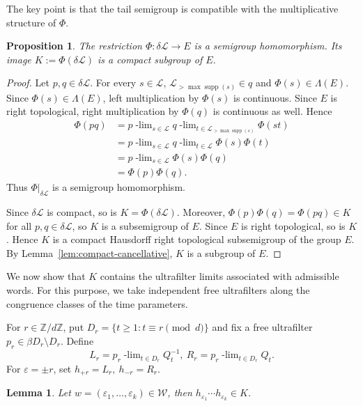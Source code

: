 \documentclass[11pt]{amsart}
\newtheorem{proposition}[theorem]{Proposition}
\newtheorem{lemma}[theorem]{Lemma}
\theoremstyle{definition}
\theoremstyle{remark}
\newcommand{\Z}{\mathbb Z}
\newcommand{\cL}{\mathcal L}
\newcommand{\cW}{\mathcal W}
\newcommand{\supp}{\operatorname{supp}}
\newcommand{\ulim}[2]{#1\!\operatorname{-lim}_{#2}}
\begin{document}
The key point is that the tail semigroup is compatible with the
multiplicative structure of $\Phi$.
\begin{proposition}\label{prop:Phi-delta}
The restriction $\Phi:\delta\cL\longrightarrow E$
is a semigroup homomorphism.  Its image $K:=\Phi(\delta\cL) $
is a compact subgroup of $E$.
\end{proposition}

\begin{proof}
Let $p,q\in\delta\cL$.  For every $s\in\cL$, $\cL_{>\max\supp(s)}\in q$ and $\Phi(s)\in\Lambda(E)$.
Since $\Phi(s)\in\Lambda(E)$, left multiplication by $\Phi(s)$ is
continuous.  Since $E$ is right topological, right multiplication by $\Phi(q)$ is continuous as well.
 Hence
\[
\begin{aligned}
 \Phi(pq)
 &=\ulim{p}{s\in\cL}\ulim{q}{t\in\cL_{>\max\supp(s)}}\Phi(st)\\
 &=\ulim{p}{s\in\cL}\ulim{q}{t\in\cL}\Phi(s)\Phi(t)\\
 &=\ulim{p}{s\in\cL}\Phi(s)\Phi(q)\\
 &=\Phi(p)\Phi(q).
\end{aligned}
\]
Thus $\Phi|_{\delta\cL}$ is a semigroup homomorphism.

Since $\delta\cL$ is compact, so is $ K=\Phi(\delta\cL)$.
Moreover, $\Phi(p)\Phi(q)=\Phi(pq)\in K$ for all $p,q\in \delta\cL$, so $K$ is a subsemigroup of $E$.  
Since $E$ is right topological, so is $K$.
Hence $K$ is a compact Hausdorff right topological subsemigroup of the group $E$.
By Lemma~\ref{lem:compact-cancellative}, $K$ is a subgroup of $E$.

\end{proof}

We now show that $K$ contains the ultrafilter limits associated with admissible words.  For this purpose, we take independent free
ultrafilters along the congruence classes of the time parameters.

For $r\in\Z/d\Z$, put $D_r=\{t\geq1:t\equiv r\pmod d\}$
and fix a free ultrafilter $p_r\in\beta D_r\setminus D_r$.
Define
\[
L_r=\ulim{  p_r}{t\in D_r}Q_t^{-1},
 \ R_r=\ulim{  p_r}{t\in D_r}Q_t.    
\]
For $\varepsilon=\pm r$, set $h_{+r}=L_r,\ h_{-r}=R_r.$

\begin{lemma}\label{lem:word-limit}
Let $w=(\varepsilon_1,\ldots,\varepsilon_k)\in\cW$,  
then $h_{\varepsilon_1}\cdots h_{\varepsilon_k}\in K$.
\end{lemma}
\end{document}
